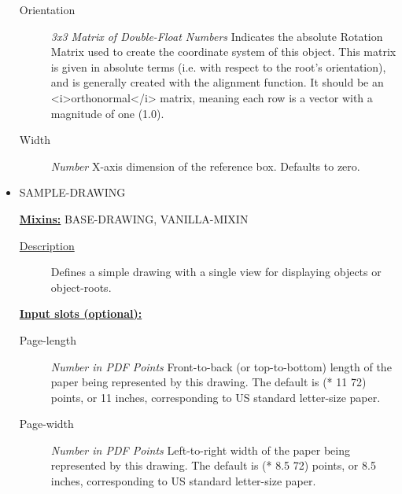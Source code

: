 \documentclass [11pt]{book}
\begin{document}
\begin{itemize}
\begin{description}
\item [Orientation]
\emph{3x3 Matrix of Double-Float Numbers} Indicates the absolute Rotation Matrix used to create
the coordinate system of this object. This matrix is given in absolute terms (i.e. with
respect to the root's orientation), and is generally created with the alignment function.
It should be an <i>orthonormal</i> matrix, meaning each row is a vector with a magnitude
of one (1.0).


\item [Width]
\emph{Number} X-axis dimension of the reference box. Defaults to zero.


\end{description}







\item {}SAMPLE-DRAWING


\textbf{
\underline{Mixins:}} BASE-DRAWING, VANILLA-MIXIN





\begin{description}

\item [
\underline{Description}]


Defines a simple drawing with a single view for displaying objects or object-roots.



\end{description}








\textbf{
\underline{Input slots (optional):}}

\begin{description}

\item [Page-length]
\emph{Number in PDF Points} Front-to-back (or top-to-bottom) length of the paper being represented
by this drawing. The default is (* 11 72) points, or 11 inches, corresponding to US standard
letter-size paper.


\item [Page-width]
\emph{Number in PDF Points} Left-to-right width of the paper being represented by this drawing.
The default is (* 8.5 72) points, or 8.5 inches, corresponding to US standard letter-size paper.



\end{description}
\end{itemize}
\end{document}
